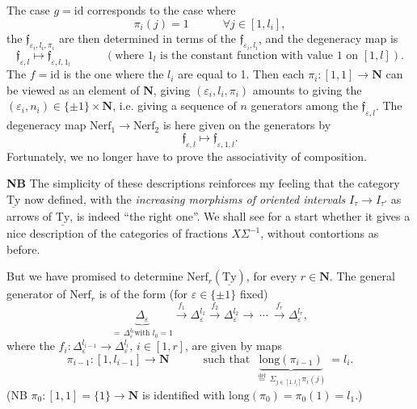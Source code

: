 \documentclass[11pt]{article}
\newcommand{\printedpage}[1]{\marginpar{\footnotesize p.~#1}}
\newcommand{\msp}[1]{\marginpar{\footnotesize [#1]}}
\newcommand{\uTy}{\underline{\mathrm{Ty}}}
\begin{document}
\printedpage{38}
The case $g=\mathrm{id}$ corresponds to the case where
\[
\pi_i(j)=1 \qquad\quad \forall j\in[1,l_i],
\]
the $\mathfrak{f}_{\varepsilon_i,l_i,\pi_i}$ are then determined in terms of the $\mathfrak{f}_{\varepsilon_i,l_i}$, and the degeneracy map is %
\[
\mathfrak{f}_{\varepsilon,l}\longmapsto\mathfrak{f}_{\varepsilon,l,1_l} \qquad\quad (\text{where } 1_l \text{ is the constant function with value 1 on } [1,l]).
\]
The $f=\mathrm{id}$ is the one where the $l_i$ are equal to 1. Then each $\pi_i : [1,1]\longrightarrow\mathbf{N}$ can be viewed as an element of $\mathbf{N}$, giving $(\varepsilon_i,l_i,\pi_i)$ amounts to giving the $(\varepsilon_i,n_i)\in\{\pm1\}\times\mathbf{N}$, i.e. giving %
\msp{page 56}
a sequence of $n$ generators among the $\mathfrak{f}_{\varepsilon,l}$. The degeneracy map $\mathrm{Nerf}_1\longrightarrow\mathrm{Nerf}_2$ is here given on the generators by
\[
\mathfrak{f}_{\varepsilon,l}\longmapsto\mathfrak{f}_{\varepsilon,1,l}.
\]
Fortunately, we no longer have to prove the associativity of composition.

\textbf{NB} The simplicity of these descriptions reinforces my feeling that the category $\uTy$ now defined, with the \textit{increasing morphisms of oriented intervals} $I_\tau\longrightarrow I_{\tau'}$ as arrows of $\uTy$, is indeed ``the right one''. We shall see for a start whether it gives a nice description of the categories of fractions $X\Sigma^{-1}$, without contortions as before.

But we have promised to determine $\mathrm{Nerf}_r(\uTy)$, for every $r\in\mathbf{N}$. The general generator of $\mathrm{Nerf}_r$ is of the form (for $\varepsilon\in\{\pm1\}$ fixed)
\[
\underbrace{\Delta_\varepsilon}_{=\,\Delta^{l_0}_\varepsilon\text{with } l_0=1}\xrightarrow{\ f_1\ }\Delta^{l_1}_\varepsilon\xrightarrow{\ f_2\ }\Delta^{l_2}_\varepsilon\longrightarrow\ \cdots\ \xrightarrow{\ f_r\ }\Delta^{l_r}_\varepsilon,
\]
where the $f_i : \Delta^{l_{i-1}}_\varepsilon\longrightarrow\Delta^{l_i}_\varepsilon$, $i\in[1,r]$, are given by maps
\[
\pi_{i-1} : [1,l_{i-1}]\longrightarrow\mathbf{N} \qquad\quad \text{such that }\ \underbrace{\mathrm{long}(\pi_{i-1})}_{\overset{\text{def}}{=}\ \Sigma_{j\in[1,l_i]}\pi_i(j)}\ = l_i. %
\]
(NB $\pi_0 : [1,1]=\{1\}\longrightarrow\mathbf{N}$ is identified with $\mathrm{long}(\pi_0)=\pi_0(1)=l_1$.)
\end{document}
